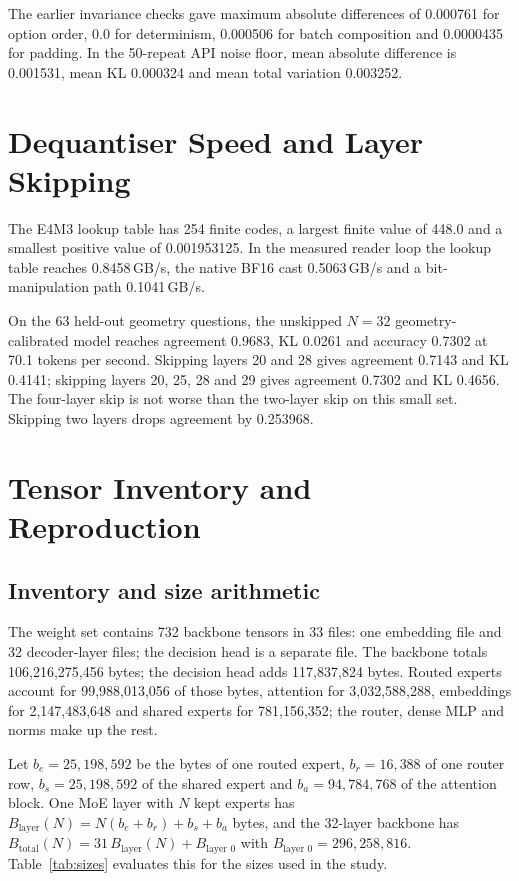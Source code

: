 \documentclass[11pt,a4paper]{article}
\begin{document}
The earlier invariance checks gave maximum absolute differences of 0.000761 for option order, 0.0 for determinism, 0.000506 for batch composition and 0.0000435 for padding. In the 50-repeat API noise floor, mean absolute difference is 0.001531, mean KL 0.000324 and mean total variation 0.003252.

\section{Dequantiser Speed and Layer Skipping}
\label{app:details}

The E4M3 lookup table has 254 finite codes, a largest finite value of 448.0 and a smallest positive value of 0.001953125. In the measured reader loop the lookup table reaches 0.8458\,GB/s, the native BF16 cast 0.5063\,GB/s and a bit-manipulation path 0.1041\,GB/s.

On the 63 held-out geometry questions, the unskipped $N=32$ geometry-calibrated model reaches agreement 0.9683, KL 0.0261 and accuracy 0.7302 at 70.1 tokens per second. Skipping layers 20 and 28 gives agreement 0.7143 and KL 0.4141; skipping layers 20, 25, 28 and 29 gives agreement 0.7302 and KL 0.4656. The four-layer skip is not worse than the two-layer skip on this small set. Skipping two layers drops agreement by 0.253968.

\section{Tensor Inventory and Reproduction}
\label{app:inventory}

\subsection{Inventory and size arithmetic}

The weight set contains 732 backbone tensors in 33 files: one embedding file and 32 decoder-layer files; the decision head is a separate file. The backbone totals 106,216,275,456 bytes; the decision head adds 117,837,824 bytes. Routed experts account for 99,988,013,056 of those bytes, attention for 3,032,588,288, embeddings for 2,147,483,648 and shared experts for 781,156,352; the router, dense MLP and norms make up the rest.

Let $b_e=25{,}198{,}592$ be the bytes of one routed expert, $b_r=16{,}388$ of one router row, $b_s=25{,}198{,}592$ of the shared expert and $b_a=94{,}784{,}768$ of the attention block. One MoE layer with $N$ kept experts has $B_{\text{layer}}(N) = N(b_e+b_r)+b_s+b_a$ bytes, and the 32-layer backbone has $B_{\text{total}}(N) = 31\,B_{\text{layer}}(N) + B_{\text{layer 0}}$ with $B_{\text{layer 0}}=296{,}258{,}816$. Table~\ref{tab:sizes} evaluates this for the sizes used in the study.
\end{document}
